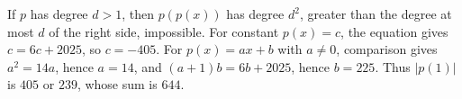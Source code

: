 If $p$ has degree $d>1$, then $p(p(x))$ has degree $d^2$, greater than the degree at most $d$ of the right side, impossible. For constant $p(x)=c$, the equation gives $c=6c+2025$, so $c=-405$. For $p(x)=ax+b$ with $a\ne 0$, comparison gives $a^2=14a$, hence $a=14$, and $(a+1)b=6b+2025$, hence $b=225$. Thus $|p(1)|$ is $405$ or $239$, whose sum is $\boxed{644}$.
